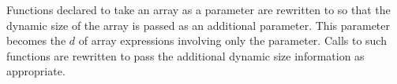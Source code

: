 
Functions declared to take an array as a parameter are rewritten to so that the dynamic size of
the array is passed as an additional parameter. This parameter becomes the $d$ of array
expressions involving only the parameter. Calls to such functions are rewritten to pass the
additional dynamic size information as appropriate.

